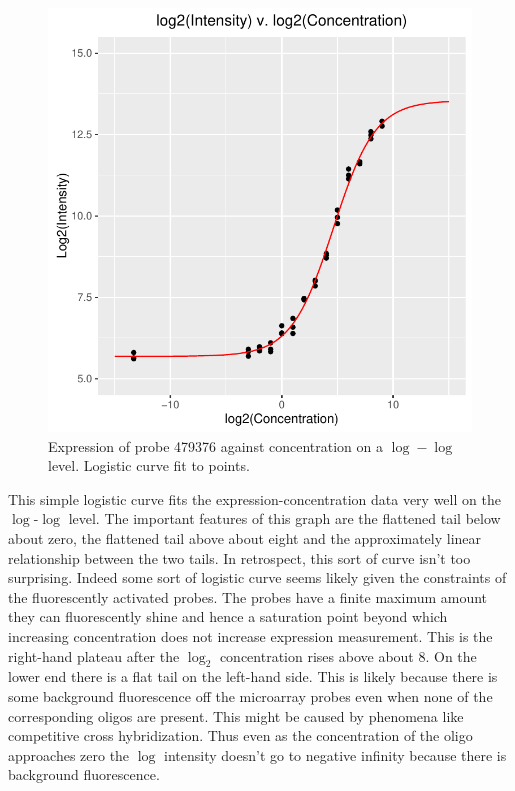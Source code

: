 \documentclass[reqno,12pt,oneside]{report}\usepackage[]{graphicx}\usepackage[]{color}
\makeatletter
\def\maxwidth{ %
  \ifdim\Gin@nat@width>\linewidth
    \linewidth
  \else
    \Gin@nat@width
  \fi
}
\newenvironment{knitrout}{}{} %
\renewenvironment{knitrout}{\begin{small}}{\end{small}}
\theoremstyle{plain}
\theoremstyle{definition}
\theoremstyle{remark}
\numberwithin{theorem}{chapter}     %
\makeatother
\begin{document}
\begin{figure}[ht]
  \centering
\begin{knitrout}
\color{fgcolor}
\includegraphics[width=\maxwidth]{figure/chap4-fig2-1} 

\end{knitrout}
\caption{Expression of probe 479376 against concentration on a $\log-\log$ level. Logistic curve fit to points.}
  \label{fig:c2}
\end{figure}

This simple logistic curve fits the expression-concentration data very well on the $\log$-$\log$ level. The important features of this graph are the flattened tail below about zero, the flattened tail above about eight and the approximately linear relationship between the two tails. In retrospect, this sort of curve isn't too surprising. Indeed some sort of logistic curve seems likely given the constraints of the fluorescently activated probes. The probes have a finite maximum amount they can fluorescently shine and hence a saturation point beyond which increasing concentration does not increase expression measurement. This is the right-hand plateau after the $\log_2$ concentration rises above about $8$. On the lower end there is a flat tail on the left-hand side. This is likely because there is some background fluorescence off the microarray probes even when none of the corresponding oligos are present. This might be caused by phenomena like competitive cross hybridization. Thus even as the concentration of the oligo approaches zero the $\log$ intensity doesn't go to negative infinity because there is background fluorescence.
\end{document}
